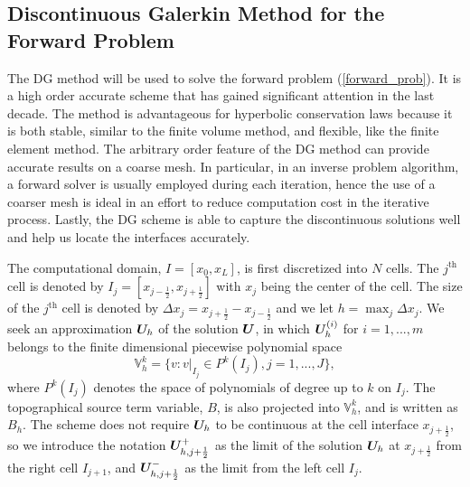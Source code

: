 

\subsection{Discontinuous Galerkin Method for the Forward Problem}\label{sec_forward_numerical_dg}

The DG method will be used to solve the forward problem (\ref{forward_prob}). It is a high order accurate scheme that has gained significant attention in the last decade. The method is advantageous for hyperbolic conservation laws because it is both stable, similar to the finite volume method, and flexible, like the finite element method. The arbitrary order feature of the DG method can provide accurate results on a coarse mesh.   
In particular, in an inverse problem algorithm, a forward solver is usually employed during each iteration, hence the use of a coarser mesh is ideal in an effort to reduce computation cost in the iterative process. Lastly, the DG scheme is able to capture the discontinuous solutions well and help us locate the interfaces accurately.

The computational domain, $I=[x_0,x_L]$, is first discretized into $N$ cells. The $j^{\text{th}}$ cell is denoted by $I_j = [x_{j-\frac{1}{2}}, x_{j+\frac{1}{2}}]$ with $x_j$ being the center of the cell. The size of the $j^{\text{th}}$ cell is denoted by $\Delta x_j = x_{j+\frac{1}{2}}-x_{j-\frac{1}{2}}$ and we let $h = \max_j {\Delta x_j}$. We seek an approximation $\bm{U}_{h}$ of the solution $\bm{U}$, in which $\bm{U}_{h}^{(i)}$ for $i=1,...,m$ belongs to the finite dimensional piecewise polynomial space
\begin{equation} \label{fespace}
\mathbb{V}^k_{h} = \{v:v|_{I_j} \in P^k(I_j), j=1,...,J\},
\end{equation}
where $P^k(I_j)$ denotes the space of polynomials of degree up to $k$ on $I_j$. The topographical source term variable, $B$, is also projected into $\mathbb{V}_{h}^k$, and is written as $B_h$. The scheme does not require $\bm{U}_{h}$ to be continuous at the cell interface $x_{j+\frac{1}{2}}$, so we introduce the notation $\bm{U}^+_{h,j+\frac{1}{2}}$ as the limit of the solution $\bm{U}_h$ at $x_{j+\frac12}$ from the right cell $I_{j+1}$, and $\bm{U}^-_{h,j+\frac{1}{2}}$ as the limit from the left cell $I_j$. 

